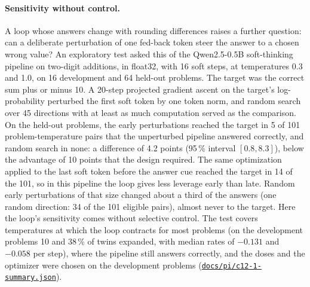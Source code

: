 \documentclass[11pt,letterpaper]{article}
\newcommand{\repourl}{https://github.com/tdj28/neural-shrimp}
\newcommand{\reporef}{arxiv-v1}
\newcommand{\repo}[1]{\href{\repourl/blob/\reporef/#1}{\nolinkurl{#1}}}
\begin{document}
\paragraph{Sensitivity without control.} A loop whose answers change with rounding differences raises a further
question: can a deliberate perturbation of one fed-back token steer the answer to a chosen wrong value? An exploratory
test asked this of the Qwen2.5-0.5B soft-thinking pipeline on two-digit additions, in float32, with 16 soft steps, at
temperatures 0.3 and 1.0, on 16 development and 64 held-out problems. The target was
the correct sum plus or minus 10. A 20-step projected gradient ascent on the target's log-probability perturbed the first
soft token by one token norm, and random search over 45 directions with at least as much computation served as the
comparison. On the held-out problems, the early perturbations reached the target in 5 of 101 problem-temperature pairs
that the unperturbed pipeline answered correctly, and random search in none: a difference of 4.2 points (95\,\%
interval $[0.8,8.3]$), below the advantage of 10 points that the design required. The same optimization applied to the
last soft token before the answer cue reached the target in 14 of the 101, so in this pipeline the loop gives less
leverage early than late. Random early perturbations of that size changed about a third of the answers (one random direction: 34 of the 101
eligible pairs), almost never to
the target. Here the loop's sensitivity comes without selective control. The test covers temperatures at which the loop
contracts for most problems (on the development problems 10 and 38\,\% of twins expanded, with median rates of
$-0.131$ and $-0.058$ per step), where the pipeline still answers correctly, and the doses and the optimizer were
chosen on the development problems (\repo{docs/pi/c12-1-summary.json}).
\end{document}
